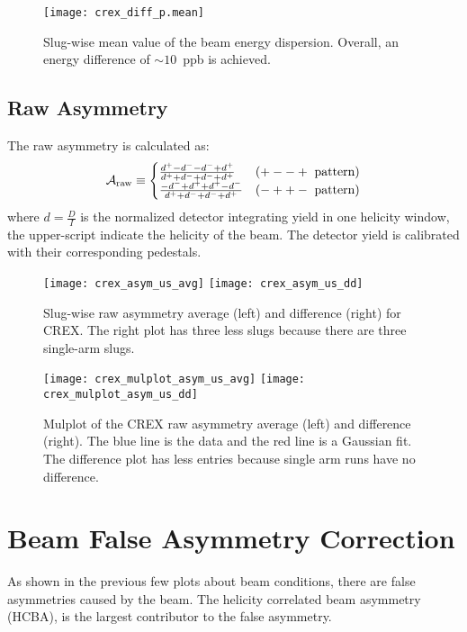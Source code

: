 \begin{figure}[!h]
    \centering
    \texttt{[image: crex\_diff\_p.mean]}
    \caption{Slug-wise mean value of the beam energy dispersion. Overall, 
    an energy difference of $\sim 10$~ppb is achieved. }
    \label{fig:crex_diff_p}
\end{figure}

\subsection{Raw Asymmetry}
The raw asymmetry is calculated as:
\begin{equation}
    \CA_{\text{raw}} \equiv 
    \begin{cases}
	\frac{d^+ - d^- - d^- + d^+}{d^+ + d^- + d^- + d^+}	& (+--+\ \text{pattern})    \\
	\frac{-d^- + d^+ + d^+ - d^-}{d^+ + d^- + d^- + d^+}	& (-++-\ \text{pattern})    \\
    \end{cases}
\end{equation}
where $d=\frac{D}{I}$ is the normalized detector integrating yield in one helicity
window, the upper-script indicate the helicity of the beam. The detector yield is
calibrated with their corresponding pedestals. 
\begin{figure}[!h]
    \centering
    \texttt{[image: crex\_asym\_us\_avg]}
    \texttt{[image: crex\_asym\_us\_dd]}
    \caption{Slug-wise raw asymmetry average (left) and difference (right) for CREX. 
    The right plot has three less slugs because there are three single-arm slugs.}
\end{figure}

\begin{figure}[!h]
    \centering
    \texttt{[image: crex\_mulplot\_asym\_us\_avg]}
    \texttt{[image: crex\_mulplot\_asym\_us\_dd]}
    \caption{Mulplot of the CREX raw asymmetry average (left) and difference (right). 
    The blue line is the data and the red line is a Gaussian fit. 
    The difference plot has less entries because single arm runs have no difference.}
\end{figure}


\section{Beam False Asymmetry Correction}
As shown in the previous few plots about beam conditions, there are false
asymmetries caused by the beam. The helicity correlated beam asymmetry (HCBA), 
is the largest contributor to the false asymmetry.

